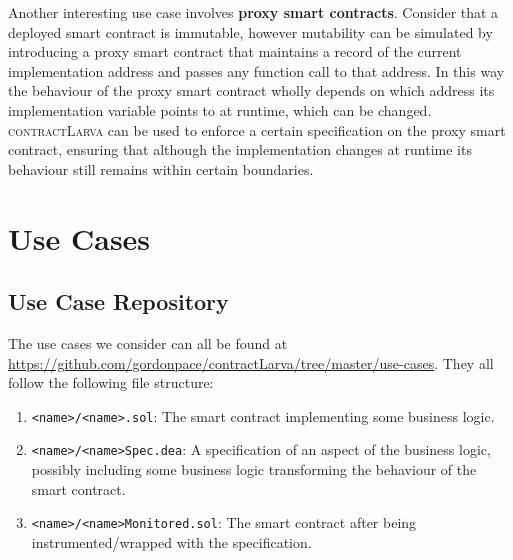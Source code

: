 \documentclass{article}
\newcommand{\contractlarva}{\textsc{contractLarva}\xspace}
\begin{document}
   Another interesting use case involves \textbf{proxy smart contracts}. Consider that a deployed smart contract is immutable, however mutability can be simulated by introducing a proxy smart contract that maintains a record of the current implementation address and passes any function call to that address. In this way the behaviour of the proxy smart contract wholly depends on which address its implementation variable points to at runtime, which can be changed. \contractlarva can be used to enforce a certain specification on the proxy smart contract, ensuring that although the implementation changes at runtime its behaviour still remains within certain boundaries.
   
   
   
   
    

   
  \section{Use Cases}
  
      \subsection{Use Case Repository}
      
      The use cases we consider can all be found at \url{https://github.com/gordonpace/contractLarva/tree/master/use-cases}. They all follow the following file structure: 
      \begin{enumerate}
       \item \texttt{<name>/<name>.sol}: The smart contract implementing some business logic.
       \item \texttt{<name>/<name>Spec.dea}: A specification of an aspect of the business logic, possibly including some business logic transforming the behaviour of the smart contract.
       \item \texttt{<name>/<name>Monitored.sol}: The smart contract after being instrumented/wrapped with the specification.
      \end{enumerate}
       
  
  
\end{document}
